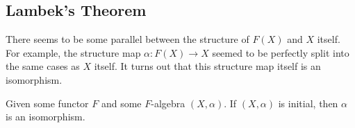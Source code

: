 





\subsection{Lambek's Theorem}

There seems to be some parallel between the structure of $F(X)$ and $X$ itself.
For example, the structure map $\alpha : F(X) \rightarrow X$ seemed to be perfectly split into the same cases as $X$ itself.
It turns out that this structure map itself is an isomorphism.

\begin{definition}
    \label{thm:lambekTheorem}
    Given some functor $F$ and some $F$-algebra $(X, \alpha)$. If $(X, \alpha)$ is initial, then $\alpha$ is an isomorphism.
\end{definition}

